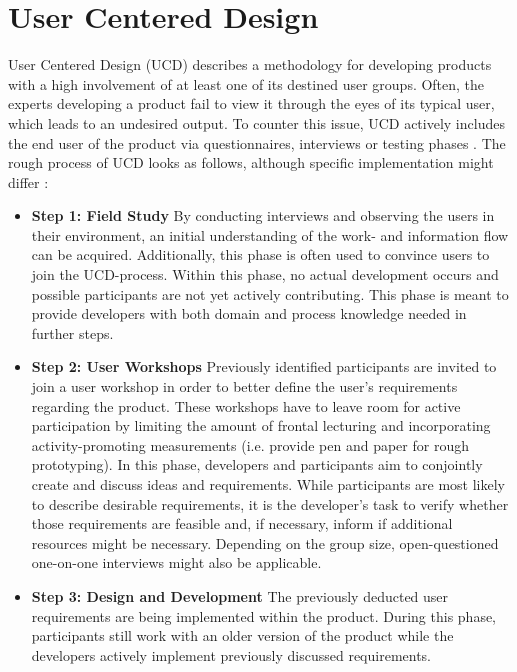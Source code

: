 \documentclass[draft,final]{vutinfth} %
\begin{document}
\section{User Centered Design}
User Centered Design (UCD) describes a methodology for developing products with a high involvement of at least one of its destined user groups. Often, the experts developing a product fail to view it through the eyes of its typical user, which leads to an undesired output. To counter this issue, UCD actively includes the end user of the product via questionnaires, interviews or testing phases \cite{9255313}. The rough process of UCD looks as follows, although specific implementation might differ \cite{7881322}:
\begin{itemize}
\item \textbf{Step 1: Field Study} By conducting interviews and observing the users in their environment, an initial understanding of the work- and information flow can be acquired. Additionally, this phase is often used to convince users to join the UCD-process. Within this phase, no actual development occurs and possible participants are not yet actively contributing. This phase is meant to provide developers with both domain and process knowledge needed in further steps.
\item \textbf{Step 2: User Workshops} Previously identified participants are invited to join a user workshop in order to better define the user's requirements regarding the product. These workshops have to leave room for active participation by limiting the amount of frontal lecturing and incorporating activity-promoting measurements (i.e. provide pen and paper for rough prototyping). In this phase, developers and participants aim to conjointly create and discuss ideas and requirements. While participants are most likely to describe desirable requirements, it is the developer's task to verify whether those requirements are feasible and, if necessary, inform if additional resources might be necessary. Depending on the group size, open-questioned one-on-one interviews might also be applicable.

\item \textbf{Step 3: Design and Development} The previously deducted user requirements are being implemented within the product. During this phase, participants still work with an older version of the product while the developers actively implement previously discussed requirements.


\end{itemize}
\end{document}
